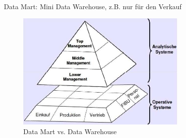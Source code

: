 \documentclass[ngerman,a4paper,12pt]{scrreprt}
\begin{document}
\ul
	\li Data Mart: Mini Data Warehouse, z.B. nur für den Verkauf
\ulE

\begin{figure}[H]
	\centering
	\includegraphics[width=0.75\textwidth]{img/V6.1.jpg}
	\caption{Data Mart vs. Data Warehouse}
	\label{}
\end{figure}
\end{document}
